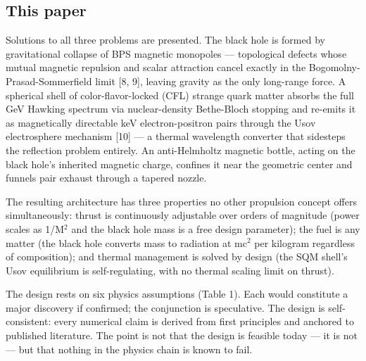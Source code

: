 \documentclass[12pt,a4paper]{article}
\begin{document}
\subsection{This paper}
Solutions to all three problems are presented. The black hole is formed by gravitational collapse of BPS magnetic monopoles --- topological defects whose mutual magnetic repulsion and scalar attraction cancel exactly in the Bogomolny-Prasad-Sommerfield limit [8, 9], leaving gravity as the only long-range force. A spherical shell of color-flavor-locked (CFL) strange quark matter absorbs the full GeV Hawking spectrum via nuclear-density Bethe-Bloch stopping and re-emits it as magnetically directable keV electron-positron pairs through the Usov electrosphere mechanism [10] --- a thermal wavelength converter that sidesteps the reflection problem entirely. An anti-Helmholtz magnetic bottle, acting on the black hole's inherited magnetic charge, confines it near the geometric center and funnels pair exhaust through a tapered nozzle.

The resulting architecture has three properties no other propulsion concept offers simultaneously: thrust is continuously adjustable over orders of magnitude (power scales as 1/M$^{2}$ and the black hole mass is a free design parameter); the fuel is any matter (the black hole converts mass to radiation at mc$^{2}$ per kilogram regardless of composition); and thermal management is solved by design (the SQM shell's Usov equilibrium is self-regulating, with no thermal scaling limit on thrust).

The design rests on six physics assumptions (Table 1). Each would constitute a major discovery if confirmed; the conjunction is speculative. The design is self-consistent: every numerical claim is derived from first principles and anchored to published literature. The point is not that the design is feasible today --- it is not --- but that nothing in the physics chain is known to fail.
\end{document}
